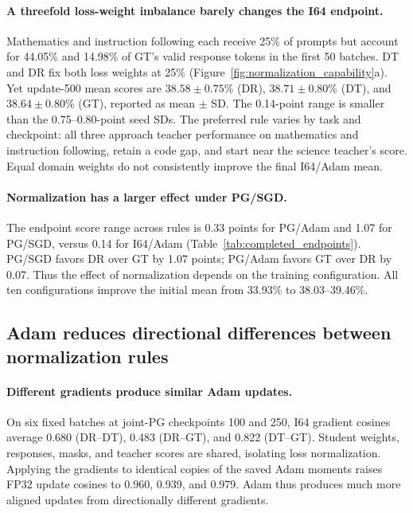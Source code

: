 \paragraph{A threefold loss-weight imbalance barely changes the I64 endpoint.}
Mathematics and instruction following each receive 25\% of prompts but account for 44.05\% and 14.98\% of GT's valid response tokens in the first 50 batches. DT and DR fix both loss weights at 25\% (Figure~\ref{fig:normalization_capability}a). Yet update-500 mean scores are $38.58\pm0.75$\% (DR), $38.71\pm0.80$\% (DT), and $38.64\pm0.80$\% (GT), reported as mean $\pm$ SD. The 0.14-point range is smaller than the 0.75--0.80-point seed SDs. The preferred rule varies by task and checkpoint: all three approach teacher performance on mathematics and instruction following, retain a code gap, and start near the science teacher's score. Equal domain weights do not consistently improve the final I64/Adam mean.



\paragraph{Normalization has a larger effect under PG/SGD.}
The endpoint score range across rules is 0.33 points for PG/Adam and 1.07 for PG/SGD, versus 0.14 for I64/Adam (Table~\ref{tab:completed_endpoints}). PG/SGD favors DR over GT by 1.07 points; PG/Adam favors GT over DR by 0.07. Thus the effect of normalization depends on the training configuration. All ten configurations improve the initial mean from 33.93\% to 38.03--39.46\%.



\subsection{Adam reduces directional differences between normalization rules}

\paragraph{Different gradients produce similar Adam updates.}
On six fixed batches at joint-PG checkpoints 100 and 250, I64 gradient cosines average 0.680 (DR--DT), 0.483 (DR--GT), and 0.822 (DT--GT). Student weights, responses, masks, and teacher scores are shared, isolating loss normalization. Applying the gradients to identical copies of the saved Adam moments raises FP32 update cosines to 0.960, 0.939, and 0.979. Adam thus produces much more aligned updates from directionally different gradients.

